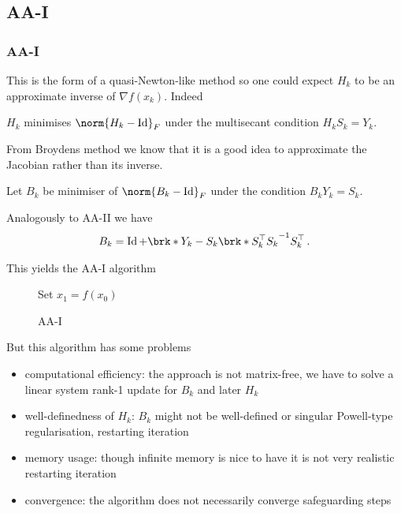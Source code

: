 \subsection{AA-I}
\begin{frame}
	\frametitle{AA-I}
	This is the form of a quasi-Newton-like method so one could expect $H_k$ to be an approximate inverse of $\nabla f(x_k)$. Indeed
	\begin{proposition}
		$H_k$ minimises $\norm{H_k-\Id}_F$ under the multisecant condition $H_kS_k=Y_k$.
	\end{proposition}
	From Broydens method we know that it is a good idea to approximate the Jacobian rather than its inverse.
	\begin{definition}
		Let $B_k$ be minimiser of $\norm{B_k-\Id}_F$ under the condition $B_kY_k=S_k$.
	\end{definition}
	Analogously to AA-II we have
	\begin{align*}
		B_k = \Id+\brk*{Y_k-S_k}\brk*{S_k^\top S_k}^{-1}S_k^\top\,.
	\end{align*}
\end{frame}

\begin{frame}
	This yields the AA-I algorithm
	\begin{figure}
	\begin{algorithm}[H]
	\caption{AA-I}
	\color{gray}
	\BlankLine
	Set $x_1=f(x_0)$
	
	\end{algorithm}
	\end{figure}
\end{frame}

\begin{frame}
	But this algorithm has some problems
	\begin{itemize}
		\item computational efficiency: the approach is not matrix-free, we have to solve a linear system \textrightarrow rank-1 update for $B_k$ and later $H_k$
		\item well-definedness of $H_k$: $B_k$ might not be well-defined or singular \textrightarrow Powell-type regularisation, restarting iteration
		\item memory usage: though infinite memory is nice to have it is not very realistic \textrightarrow restarting iteration
		\item convergence: the algorithm does not necessarily converge \textrightarrow safeguarding steps
	\end{itemize}
\end{frame}

